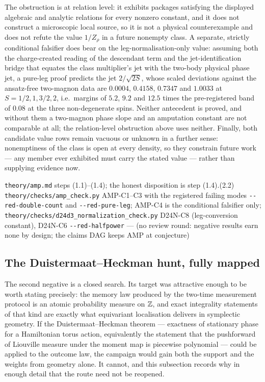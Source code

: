 \begin{scope}
\label{scope:amputation}
The obstruction is at relation level: it exhibits packages satisfying the
displayed algebraic and analytic relations for every nonzero constant, and it
does not construct a microscopic local source, so it is not a physical
counterexample and does not refute the value $1/Z_\rho$ in a future nonempty
class. A separate, strictly conditional falsifier does bear on the
leg-normalisation-only value: assuming both the charge-created reading of the
descendant term and the jet-identification bridge that equates the class
multiplier's jet with the two-body physical phase jet, a pure-leg proof
predicts the jet $2/\sqrt{2S}$, whose scaled deviations against the
ansatz-free two-magnon data are $0.0004$, $0.4158$, $0.7347$ and $1.0033$ at
$S = 1/2, 1, 3/2, 2$, i.e.\ margins of $5.2$, $9.2$ and $12.5$ times the
pre-registered band of $0.08$ at the three non-degenerate spins. Neither
antecedent is proved, and without them a two-magnon phase slope and an
amputation constant are not comparable at all; the relation-level obstruction
above uses neither. Finally, both candidate value rows remain vacuous or
unknown in a further sense: nonemptiness of the class is open at every
density, so they constrain future work — any member ever exhibited must carry
the stated value — rather than supplying evidence now.
\end{scope}

%
{\texttt{theory/amp.md} steps (1.1)--(1.4); the honest disposition is step (1.4).(2.2)}%
{\texttt{theory/checks/amp\_check.py} AMP-C1--C3 with the registered failing modes \texttt{-{}-red-double-count} and \texttt{-{}-red-pure-leg}; AMP-C4 is the conditional falsifier only; \texttt{theory/checks/d24d3\_normalization\_check.py} D24N-C8 (leg-conversion constant), D24N-C6 \texttt{-{}-red-halfpower}}%
{--- (no review round: negative results earn none by design; the claims DAG keeps AMP at conjecture)}

\subsection{The Duistermaat--Heckman hunt, fully mapped}
\label{sub:dh-hunt}

The second negative is a closed search. Its target was attractive enough to be
worth stating precisely: the memory law produced by the two-time measurement
protocol is an atomic probability measure on $\mathbb{Z}$, and exact integrality
statements of that kind are exactly what equivariant localisation delivers in
symplectic geometry. If the Duistermaat--Heckman theorem — exactness of
stationary phase for a Hamiltonian torus action, equivalently the statement
that the pushforward of Liouville measure under the moment map is piecewise
polynomial — could be applied to the outcome law, the campaign would gain both
the support and the weights from geometry alone. It cannot, and this
subsection records why in enough detail that the route need not be reopened.

